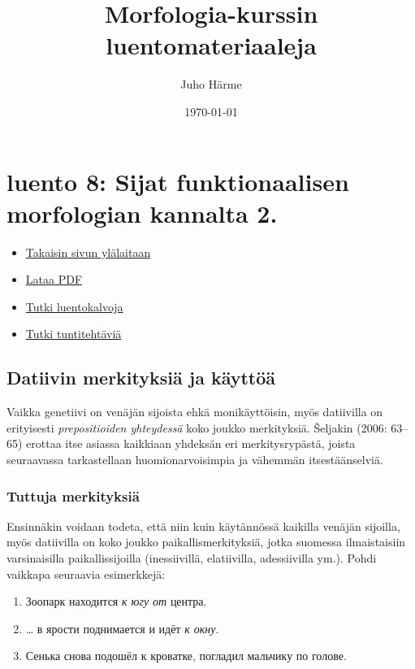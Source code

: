 \documentclass[]{scrartcl}
\author{Juho Härme}
\title{Morfologia-kurssin luentomateriaaleja}
\date{\today}
\providecommand{\tightlist}{%
  \setlength{\itemsep}{0pt}\setlength{\parskip}{0pt}}
\begin{document}
\maketitle
\tableofcontents
\newpage



\section{luento 8: Sijat funktionaalisen morfologian kannalta
2.}\label{luento-8-sijat-funktionaalisen-morfologian-kannalta-2.}

\begin{itemize}
\tightlist
\item
  \href{https://mustikka.uta.fi/~juho_harme/morfologia/\#tästä-kurssista}{Takaisin
  sivun ylälaitaan}
\item
  \href{http://mustikka.uta.fi/~juho_harme/morfologia/materiaalit/luento8.pdf}{Lataa
  PDF}
\item
  \href{http://mustikka.uta.fi/~juho_harme/morfologia/presentations/luento8.html}{Tutki
  luentokalvoja}
\item
  \href{http://mustikka.uta.fi/~juho_harme/morfologia/tehtavat/luento8.pdf}{Tutki
  tuntitehtäviä}
\end{itemize}

\subsection{Datiivin merkityksiä ja
käyttöä}\label{datiivin-merkityksiuxe4-ja-kuxe4yttuxf6uxe4}

Vaikka genetiivi on venäjän sijoista ehkä monikäyttöisin, myös
datiivilla on erityisesti \emph{prepositioiden yhteydessä} koko joukko
merkityksiä. Šeljakin (2006: 63--65) erottaa itse asiassa kaikkiaan
yhdeksän eri merkitysrypästä, joista seuraavassa tarkastellaan
huomionarvoisimpia ja vähemmän itsestäänselviä.

\subsubsection{Tuttuja merkityksiä}\label{tuttuja-merkityksiuxe4}

Ensinnäkin voidaan todeta, että niin kuin käytännössä kaikilla venäjän
sijoilla, myös datiivilla on koko joukko paikallismerkityksiä, jotka
suomessa ilmaistaisiin varsinaisilla paikallissijoilla (inessiivillä,
elatiivilla, adessiivilla ym.). Pohdi vaikkapa seuraavia esimerkkejä:

\begin{enumerate}
\def\labelenumi{(\arabic{enumi})}
\tightlist
\item
  Зоопарк находится \emph{к югу от} центра.
\item
  \ldots{} в ярости поднимается и идёт \emph{к окну}.
\item
  Сенька снова подошёл к кроватке, погладил мальчику по голове.
\end{enumerate}
\end{document}
